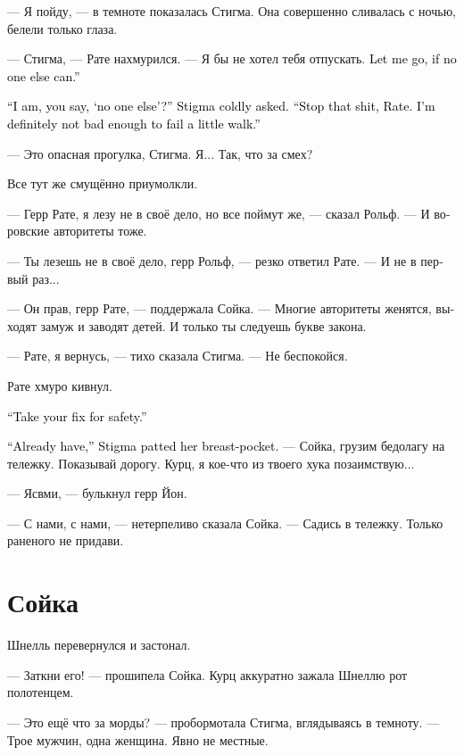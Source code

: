 \documentclass[a4paper,12pt,fleqn]{book}\usepackage{cooltooltips}\usepackage{polyglossia}\setdefaultlanguage[babelshorthands=true]{russian}\setotherlanguage{english}\defaultfontfeatures{Ligatures=TeX,Mapping=tex-text} \usepackage{xcolor}\definecolor{lightgray}{HTML}{bbbbbb}\color{lightgray}\newcommand{\ml}[3]{\textenglish{\textcolor{black}{#3}}}
\begin{document}
--- Я пойду, --- в темноте показалась Стигма.
Она совершенно сливалась с ночью, белели только глаза.

--- Стигма, --- Рате нахмурился.
--- Я бы не хотел тебя отпускать.
\ml{$0$}
{Давай я уже пойду, если совсем некому.}
{Let me go, if no one else can.''}

\ml{$0$}
{--- Я, по-твоему, <<некому>>? --- осведомилась Стигма.}
{``I am, you say, `no one else'?'' Stigma coldly asked.}
\ml{$0$}
{--- Всё, хватит, Рате.}
{``Stop that shit, Rate.}
\ml{$0$}
{Я недостаточно раскисла, чтобы не выдержать небольшую прогулку.}
{I'm definitely not bad enough to fail a little walk.''}

--- Это опасная прогулка, Стигма.
Я...
Так, что за смех?

Все тут же смущённо приумолкли.

--- Герр Рате, я лезу не в своё дело, но все поймут же, --- сказал Рольф.
--- И воровские авторитеты тоже.

--- Ты лезешь не в своё дело, герр Рольф, --- резко ответил Рате.
--- И не в первый раз...

--- Он прав, герр Рате, --- поддержала Сойка.
--- Многие авторитеты женятся, выходят замуж и заводят детей.
И только ты следуешь букве закона.

--- Рате, я вернусь, --- тихо сказала Стигма.
--- Не беспокойся.

Рате хмуро кивнул.

\ml{$0$}
{--- Дозы возьми на всякий случай.}
{``Take your fix for safety.''}

\ml{$0$}
{--- Уже, --- Стигма похлопала по нагрудному карману.}
{``Already have,'' Stigma patted her breast-pocket.}
--- Сойка, грузим бедолагу на тележку.
Показывай дорогу.
Курц, я кое-что из твоего хука позаимствую...

--- Ясвми, --- булькнул герр Йон.

--- С нами, с нами, --- нетерпеливо сказала Сойка.
--- Садись в тележку.
Только раненого не придави.

\section{Сойка}

Шнелль перевернулся и застонал.

--- Заткни его! --- прошипела Сойка.
Курц аккуратно зажала Шнеллю рот полотенцем.

--- Это ещё что за морды? --- пробормотала Стигма, вглядываясь в темноту.
--- Трое мужчин, одна женщина.
Явно не местные.
\end{document}
